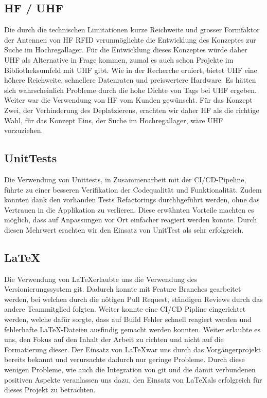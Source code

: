 \subsection{HF / UHF}
Die durch die technischen Limitationen kurze Reichweite und grosser Formfaktor der Antennen von \gls{HF} \gls{RFID} verunmöglichte die Entwicklung des Konzeptes zur Suche im Hochregallager. Für die Entwicklung dieses Konzeptes würde daher \gls{UHF} als Alternative in Frage kommen, zumal es auch schon Projekte im Bibliotheksumfeld mit \gls{UHF} gibt. Wie in der Recherche eruiert, bietet \gls{UHF} eine höhere Reichweite, schnellere Datenraten und preiswertere Hardware. Es hätten sich wahrscheinlich Probleme durch die hohe Dichte von Tags bei \gls{UHF} ergeben. Weiter war die Verwendung von \gls{HF} vom Kunden gewünscht. Für das Konzept Zwei, der Verhinderung des Deplatzierens, erachten wir daher \gls{HF} als die richtige Wahl, für das Konzept Eins, der Suche im Hochregallager, wäre \gls{UHF} vorzuziehen.

\subsection{UnitTests}
Die Verwendung von Unittests, in Zusammenarbeit mit der CI/CD-Pipeline, führte zu einer besseren Verifikation der Codequalität und Funktionalität. Zudem konnten dank den vorhanden Tests Refactorings durchhgeführt werden, ohne das Vertrauen in die Applikation zu verlieren. Diese erwähnten Vorteile machten es möglich, dass auf Anpassungen vor Ort einfacher reagiert werden konnte. Durch diesen Mehrwert erachten wir den Einsatz von UnitTest als sehr erfolgreich.

\subsection{\LaTeX}
Die Verwendung von \LaTeX erlaubte uns die Verwendung des Versionierungssystem git. Dadurch konnte mit Feature Branches gearbeitet werden, bei welchen durch die nötigen Pull Request, ständigen Reviews durch das andere Teammitglied folgten. Weiter konnte eine CI/CD Pipline eingerichtet werden, welche dafür sorgte, dass auf Build Fehler schnell reagiert werden und fehlerhafte \LaTeX-Dateien ausfindig gemacht werden konnten. Weiter erlaubte es uns, den Fokus auf den Inhalt der Arbeit zu richten und nicht auf die Formatierung dieser. Der Einsatz von \LaTeX war uns durch das Vorgängerprojekt bereits bekannt und verursachte dadurch nur geringe Probleme. Durch diese wenigen Probleme, wie auch die Integration von git und die damit verbundenen positiven Aspekte veranlassen uns dazu, den Einsatz von \LaTeX als erfolgreich für dieses Projekt zu betrachten.

